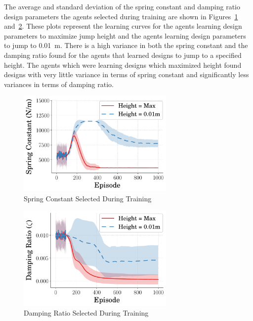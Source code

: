 \documentclass[letterpaper, 10 pt, conference]{ieeeconf}  %
\begin{document}
The average and standard deviation of the spring constant and damping ratio design parameters the agents selected during training are shown in Figures~\ref{fig:spring_vs_step_close} and~\ref{fig:zeta_vs_step_close}. These plots represent the learning curves for the agents learning design parameters to maximize jump height and the agents learning design parameters to jump to 0.01~m. There is a high variance in both the spring constant and the damping ratio found for the agents that learned designs to jump to a specified height. The agents which were learning designs which maximized height found designs with very little variance in terms of spring constant and significantly less variances in terms of damping ratio.
%
\begin{figure}[tb]
        \begin{center}
        \includegraphics[width = 3in]{figures/narrow_design_space/SpringVsTime_2021-10-12_221522.pdf}  
        \caption{Spring Constant Selected During Training}
        \label{fig:spring_vs_step_close}
        \end{center}
        \end{figure}
%
\begin{figure}[tb]
        \begin{center}
        \includegraphics[width = 3in]{figures/narrow_design_space/ZetaVsTime_2021-10-12_144819.pdf}  
        \caption{Damping Ratio Selected During Training}
        \label{fig:zeta_vs_step_close}
        \end{center}
        \end{figure}
%
\end{document}
